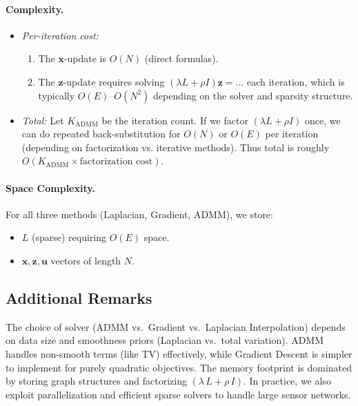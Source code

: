 \documentclass[12pt]{article}                                %
\begin{document}
\paragraph{Complexity.}
\begin{itemize}
    \item \emph{Per-iteration cost:} 
      \begin{enumerate}
         \item The $\mathbf{x}$-update is $O(N)$ (direct formulas).  
         \item The $\mathbf{z}$-update requires solving $(\lambda L + \rho I)\mathbf{z}=\dots$ each iteration, which is typically $O(E)$--$O(N^2)$ depending on the solver and sparsity structure.
      \end{enumerate}
    \item \emph{Total:} 
      Let $K_{\mathrm{ADMM}}$ be the iteration count. If we factor $(\lambda L + \rho I)$ once, we can do repeated back-substitution for $O(N)$ or $O(E)$ per iteration (depending on factorization vs. iterative methods). Thus total is roughly $O(K_{\mathrm{ADMM}} \times \text{factorization cost})$.
\end{itemize}

\paragraph{Space Complexity.} 
For all three methods (Laplacian, Gradient, ADMM), we store:
\begin{itemize}
    \item $L$ (sparse) requiring $O(E)$ space. 
    \item $\mathbf{x}, \mathbf{z}, \mathbf{u}$ vectors of length $N$.
\end{itemize}


\subsection{Additional Remarks}
The choice of solver (ADMM vs.\ Gradient vs.\ Laplacian Interpolation) depends on data size and smoothness priors (Laplacian vs.\ total variation). ADMM handles non-smooth terms (like TV) effectively, while Gradient Descent is simpler to implement for purely quadratic objectives. The memory footprint is dominated by storing graph structures and factorizing $(\lambda\,L+\rho\,I)$. In practice, we also exploit parallelization and efficient sparse solvers to handle large sensor networks.
\end{document}
